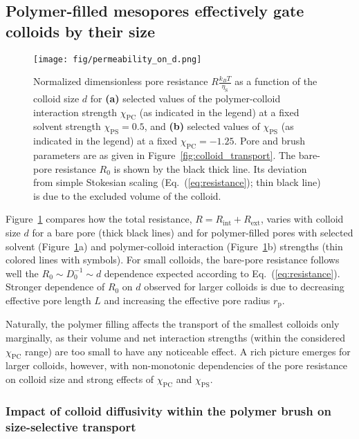 \documentclass[12pt, a4paper]{article}
\begin{document}
\subsection{Polymer-filled mesopores effectively gate colloids by their size}

\begin{figure}
    \centering
    \texttt{[image: fig/permeability\_on\_d.png]}
    \caption{
    Normalized dimensionless pore resistance $R\tfrac{k_{B}T}{\eta_{\text{S}}} $ as a function of the colloid size $d$ for \textbf{(a)} selected values of the polymer-colloid interaction strength $\chi_{\text{PC}}$ (as indicated in the legend) at a fixed solvent strength $\chi_{\text{PS}} =0.5$, and \textbf{(b)} selected values of $\chi_{\text{PS}}$ (as indicated in the legend) at a fixed $\chi_{\text{PC}} = -1.25$.
    Pore and brush parameters are as given in Figure~\ref{fig:colloid_transport}. 
    The bare-pore resistance $R_{0}$ is shown by the black thick line. Its deviation from simple Stokesian scaling (Eq.~(\ref{eq:resistance}); thin black line) is due to the excluded volume of the colloid.
    }
    \label{fig:R_vs_d}
\end{figure}

Figure~\ref{fig:R_vs_d} compares how the total resistance, $R=R_{\text{int}}+R_{\text{ext}}$, varies with colloid size $d$ for a bare pore (thick black lines) and for polymer-filled pores with selected solvent (Figure~\ref{fig:R_vs_d}a) and polymer-colloid interaction (Figure~\ref{fig:R_vs_d}b) strengths (thin colored lines with symbols).
For small colloids, the bare-pore resistance follows well the $R_0 \sim D_0^{-1} \sim d$ dependence expected according to Eq.~(\ref{eq:resistance}).
Stronger dependence of $R_0$ on $d$ observed for larger colloids is due to decreasing effective pore length $L$ and increasing the effective pore radius $r_{\text{p}}$.

Naturally, the polymer filling affects the transport of the smallest colloids only marginally, as their volume and net interaction strengths (within the considered $\chi_{\text{PC}}$ range) are too small to have any noticeable effect. 
A rich picture emerges for larger colloids, however, with non-monotonic dependencies of the pore resistance on colloid size and strong effects of $\chi_{\text{PC}}$ and $\chi_{\text{PS}}$. 


\subsubsection{Impact of colloid diffusivity within the polymer brush on size-selective transport}
\end{document}
